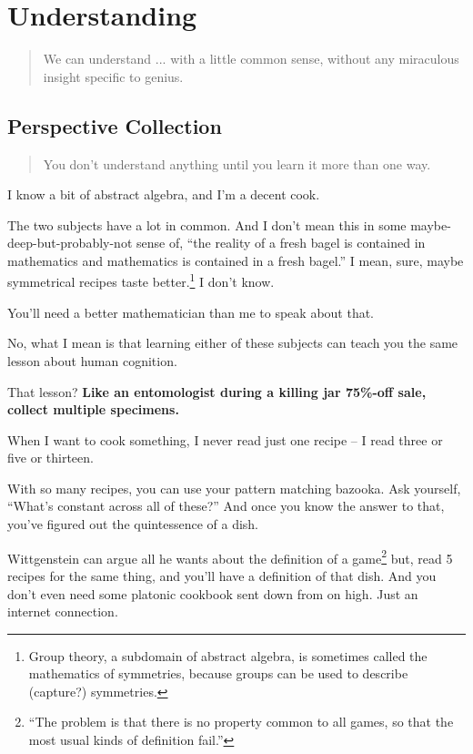\chapter{Understanding}

\begin{quote}
 We can understand ... with a little common sense, without any miraculous insight specific to genius.
\end{quote}

\section{Perspective Collection}

\begin{quote}
You don't understand anything until you learn it more than one way.
\end{quote}

I know a bit of abstract algebra, and I'm a decent cook. 

The two subjects have a lot in common. And I don't mean this in some
maybe-deep-but-probably-not sense of, ``the reality of a fresh bagel is contained in mathematics and mathematics
is contained in a fresh bagel.'' I mean, sure, maybe symmetrical
recipes taste better.\footnote{Group theory, a subdomain of abstract algebra, is
  sometimes called the mathematics of symmetries, because groups can be used to
  describe (capture?) symmetries.} I don't know.

You'll need a better mathematician than me to speak about that.

No, what I mean is that learning either of these subjects can teach you the same
lesson about human cognition.

That lesson? \textbf{Like an entomologist during a killing jar 75\%-off sale, collect
  multiple specimens.}

When I want to cook something, I never read just one recipe -- I read three
or five or thirteen.

With so many recipes, you can use your pattern matching bazooka. Ask yourself, ``What's
constant across all of these?'' And once you know the answer to that,
you've figured out the quintessence of a dish.

Wittgenstein can argue all he wants about the definition of a
game\footnote{``The problem is that there is no property common to all games, so that the most usual kinds of definition fail.''} but, read 5
recipes for the same thing, and you'll have a definition of that dish. And you
don't even need some platonic cookbook sent down from on high. Just an internet
connection.

